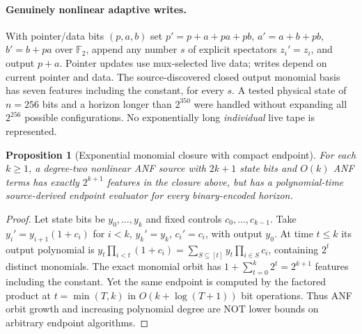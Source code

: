 \documentclass[11pt]{article}
\newtheorem{proposition}[theorem]{Proposition}
\begin{document}
\paragraph{Genuinely nonlinear adaptive writes.}
With pointer/data bits $(p,a,b)$ set $p'=p+a+pa+pb$, $a'=a+b+pb$, $b'=b+pa$ over $\mathbb F_2$, append any number $s$ of explicit spectators $z_i'=z_i$, and output $p+a$. Pointer updates use mux-selected live data; writes depend on current pointer and data. The source-discovered closed output monomial basis has seven features including the constant, for every $s$. A tested physical state of $n=256$ bits and a horizon longer than $2^{350}$ were handled without expanding all $2^{256}$ possible configurations. No exponentially long \emph{individual} live tape is represented.

\begin{proposition}[Exponential monomial closure with compact endpoint]
For each $k\ge1$, a degree-two nonlinear ANF source with $2k+1$ state bits and $O(k)$ ANF terms has exactly $2^{k+1}$ features in the closure above, but has a polynomial-time source-derived endpoint evaluator for every binary-encoded horizon.
\end{proposition}
\begin{proof}
Let state bits be $y_0,\ldots,y_k$ and fixed controls $c_0,\ldots,c_{k-1}$. Take $y_i'=y_{i+1}(1+c_i)$ for $i<k$, $y_k'=y_k$, $c_i'=c_i$, with output $y_0$. At time $t\le k$ its output polynomial is $y_t\prod_{i<t}(1+c_i)=\sum_{S\subseteq[t]}y_t\prod_{i\in S}c_i$, containing $2^t$ distinct monomials. The exact monomial orbit has $1+\sum_{t=0}^k2^t=2^{k+1}$ features including the constant. Yet the same endpoint is computed by the factored product at $t=\min(T,k)$ in $O(k+\log(T+1))$ bit operations. Thus ANF orbit growth and increasing polynomial degree are NOT lower bounds on arbitrary endpoint algorithms.
\end{proof}
\end{document}
